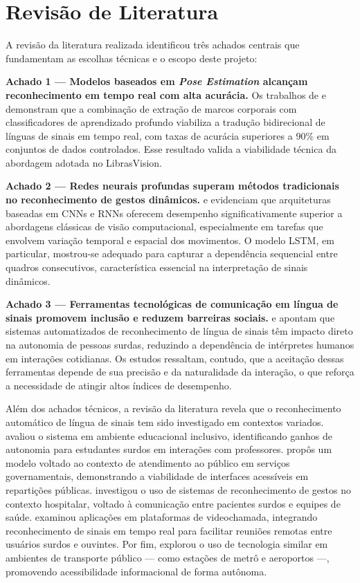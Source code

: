 \section{Revisão de Literatura}

A revisão da literatura realizada identificou três achados centrais que fundamentam as escolhas técnicas e o escopo deste projeto:

\textbf{Achado 1 — Modelos baseados em \textit{Pose Estimation} alcançam reconhecimento em tempo real com alta acurácia.}
Os trabalhos de \cite{attili:24} e \cite{jain:24} demonstram que a combinação de extração de marcos corporais com classificadores de aprendizado profundo viabiliza a tradução bidirecional de línguas de sinais em tempo real, com taxas de acurácia superiores a 90\% em conjuntos de dados controlados. Esse resultado valida a viabilidade técnica da abordagem adotada no LibrasVision.

\textbf{Achado 2 — Redes neurais profundas superam métodos tradicionais no reconhecimento de gestos dinâmicos.}
\cite{abdulhussein:20} e \cite{li:22} evidenciam que arquiteturas baseadas em CNNs e RNNs oferecem desempenho significativamente superior a abordagens clássicas de visão computacional, especialmente em tarefas que envolvem variação temporal e espacial dos movimentos. O modelo LSTM, em particular, mostrou-se adequado para capturar a dependência sequencial entre quadros consecutivos, característica essencial na interpretação de sinais dinâmicos.

\textbf{Achado 3 — Ferramentas tecnológicas de comunicação em língua de sinais promovem inclusão e reduzem barreiras sociais.}
\cite{wang:24} e \cite{dockens:18} apontam que sistemas automatizados de reconhecimento de língua de sinais têm impacto direto na autonomia de pessoas surdas, reduzindo a dependência de intérpretes humanos em interações cotidianas. Os estudos ressaltam, contudo, que a aceitação dessas ferramentas depende de sua precisão e da naturalidade da interação, o que reforça a necessidade de atingir altos índices de desempenho.

Além dos achados técnicos, a revisão da literatura revela que o reconhecimento automático de língua de sinais tem sido investigado em contextos variados. \cite{attili:24} avaliou o sistema em ambiente educacional inclusivo, identificando ganhos de autonomia para estudantes surdos em interações com professores. \cite{jain:24} propôs um modelo voltado ao contexto de atendimento ao público em serviços governamentais, demonstrando a viabilidade de interfaces acessíveis em repartições públicas. \cite{abdulhussein:20} investigou o uso de sistemas de reconhecimento de gestos no contexto hospitalar, voltado à comunicação entre pacientes surdos e equipes de saúde. \cite{li:22} examinou aplicações em plataformas de videochamada, integrando reconhecimento de sinais em tempo real para facilitar reuniões remotas entre usuários surdos e ouvintes. Por fim, \cite{wang:24} explorou o uso de tecnologia similar em ambientes de transporte público — como estações de metrô e aeroportos —, promovendo acessibilidade informacional de forma autônoma.

